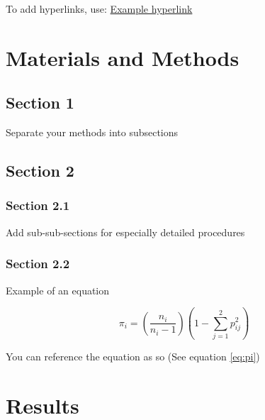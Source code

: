 \documentclass[10pt,letterpaper]{article}
\begin{document}
To add hyperlinks, use: \href{https://www.overleaf.com/learn}{Example hyperlink}


\section*{Materials and Methods}

\subsection*{Section 1}

Separate your methods into subsections

\subsection*{Section 2}

\subsubsection*{Section 2.1}

Add sub-sub-sections for especially detailed procedures

\subsubsection*{Section 2.2}

Example of an equation

\begin{equation}
\pi_i = \left( \frac{n_i}{n_i-1} \right) \left( 1 - \sum_{j = 1}^{2} p_{ij}^2 \right)
\label{eq:pi}
\end{equation}

You can reference the equation as so (See equation \ref{eq:pi})

\section*{Results}
\end{document}
